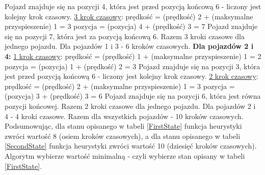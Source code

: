 Pojazd znajduje się na pozycji 4, która jest przed pozycją końcową 6 - liczony jest kolejny krok czasowy.
\newline
\newline
\underline{3 krok czasowy}:
\newline
\newline
prędkość = (prędkość) 2 + (maksymalne przyspieszenie) 1 = 3
\newline
pozycja = (pozycja) 4 + (prędkość) 3 = 7
\newline
\newline
Pojazd znajduje się na pozycji 7, która jest za pozycją końcową 6.
\newline
\newline
Razem 3 kroki czasowe dla jednego pojazdu. Dla pojazdów 1 i 3 - 6 kroków czasowych.
\newline
\newline
\textbf{Dla pojazdów 2 i 4:}
\newline
\newline
\underline{1 krok czasowy}:
\newline
\newline
prędkość = (prędkość) 1 + (maksymalne przyspieszenie) 1 = 2
\newline
pozycja = (pozycja) 1 + (prędkość) 2 = 3
\newline
\newline
Pojazd znajduje się na pozycji 3, która jest przed pozycją końcową 6 - liczony jest kolejny krok czasowy.
\newline
\newline
\underline{2 krok czasowy}:
\newline
\newline
prędkość = (prędkość) 2 + (maksymalne przyspieszenie) 1 = 3
\newline
pozycja = (pozycja) 3 + (prędkość) 3 = 6
\newline
\newline
Pojazd znajduje się na pozycji 6, która jest równa pozycji końcowej.
\newline
\newline
Razem 2 kroki czasowe dla jednego pojazdu. Dla pojazdów 2 i 4 - 4 kroki czasowe.
\newline
\newline
Razem dla wszystkich pojazdów - 10 kroków czasowych.
\newline
\newline
\newline
Podsumowując, dla stanu opisanego w tabeli \ref{FirstState} funkcja heurystyki zwróci wartość 8 (osiem kroków czasowych), a dla stanu opisanego w tabeli \ref{SecondState} funkcja heurystyki zwróci wartość 10 (dziesięć kroków czasowych). Algorytm wybierze wartość minimalną - czyli wybierze stan opisany w tabeli \ref{FirstState}.

